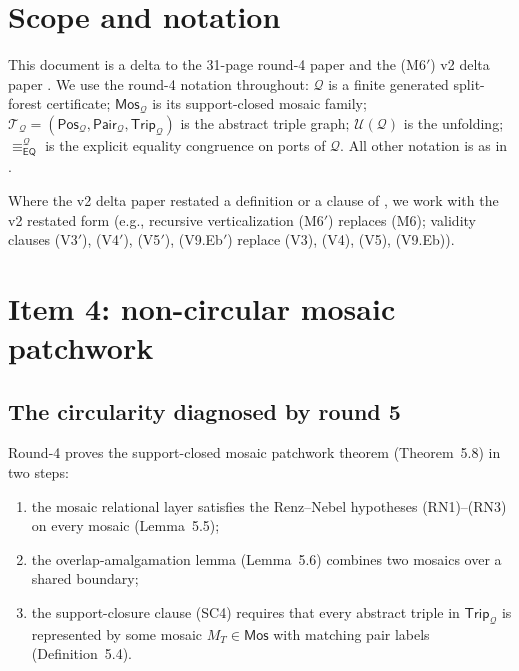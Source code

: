 \documentclass[11pt]{article}
\theoremstyle{definition}
\theoremstyle{remark}
\newcommand{\EQ}{\mathsf{EQ}}
\newcommand{\Mos}{\mathsf{Mos}}
\newcommand{\Pos}{\mathsf{Pos}}
\newcommand{\Trip}{\mathsf{Trip}}
\newcommand{\Pair}{\mathsf{Pair}}
\newcommand{\Q}{\mathcal{Q}}
\newcommand{\U}{\mathcal{U}}
\newcommand{\T}{\mathcal{T}}
\newcommand{\eqc}{\equiv_{\EQ}}
\begin{document}
\tableofcontents
\bigskip

\section{Scope and notation}
\label{sec:scope}

This document is a delta to the 31-page round-4 paper
\cite{GPT55Repaired} and the (M6$'$) v2 delta paper \cite{V2Delta}.
We use the round-4 notation throughout: $\Q$ is a finite generated
split-forest certificate; $\Mos_\Q$ is its support-closed mosaic
family; $\T_\Q=(\Pos_\Q,\Pair_\Q,\Trip_\Q)$ is the abstract triple
graph; $\U(\Q)$ is the unfolding; $\eqc^\Q$ is the explicit equality
congruence on ports of $\Q$.  All other notation is as in
\cite{GPT55Repaired}.

Where the v2 delta paper restated a definition or a clause of
\cite{GPT55Repaired}, we work with the v2 restated form
(e.g., recursive verticalization (M6$'$) replaces (M6); validity
clauses (V3$'$), (V4$'$), (V5$'$), (V9.Eb$'$) replace (V3), (V4),
(V5), (V9.Eb)).

\section{Item 4: non-circular mosaic patchwork}
\label{sec:item4}

\subsection{The circularity diagnosed by round 5}

Round-4 \cite{GPT55Repaired} proves the support-closed mosaic
patchwork theorem (Theorem~5.8) in two steps:
\begin{enumerate}
\item the mosaic relational layer satisfies the Renz--Nebel
hypotheses (RN1)--(RN3) on every mosaic (Lemma~5.5);
\item the overlap-amalgamation lemma (Lemma~5.6) combines two
mosaics over a shared boundary;
\item the support-closure clause (SC4) requires that every abstract
triple in $\Trip_\Q$ is represented by some mosaic $M_T\in\Mos$ with
matching pair labels (Definition~5.4).
\end{enumerate}
\end{document}
